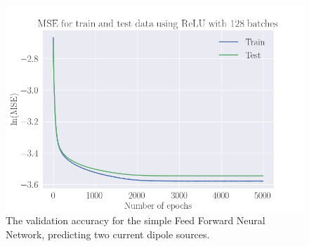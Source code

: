 \documentclass[a4paper, UKenglish, 11pt]{uiomaster}
\begin{document}
\begin{figure}[!htb]
    \centering
    \includegraphics[width=\linewidth]{figures/MSE_26june_two_dipoles_w_amplitude_5000_SGD_lr0.001_wd0.1_mom0.35_bs128_10noise_ReLU_128_5000_N_dipoles_2.png}
    \caption{The validation accuracy for the simple Feed Forward Neural Network, predicting two current dipole sources.}
    \label{fig:dipole_area_result}
\end{figure}
\end{document}
